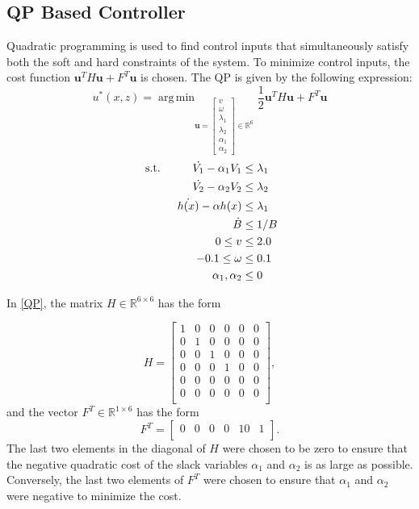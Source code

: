 \documentclass[journal]{IEEEtran}
\DeclareMathOperator*{\argmin}{arg\,min}
\begin{document}
\subsection{QP Based Controller}
Quadratic programming is used to find control inputs that simultaneously satisfy both the soft and hard constraints of the system. To minimize control inputs, the cost function $\textbf{u}^TH\textbf{u}+F^T\textbf{u}$ is chosen. The QP is given by the following expression:
\begin{equation}
u^*(x,z) = \argmin_{\textbf{u}=
\left[\begin{matrix}
v\\
\omega\\
\lambda_1\\
\lambda_2\\
\alpha_1\\
\alpha_2
\end{matrix}\right]
\in \mathbb{R}^6}
\frac{1}{2}\textbf{u}^TH\textbf{u}+F^T\textbf{u} 
\label{QP}
\end{equation}
\begin{align}
\text{ s.t.\hspace{1cm}}
\dot{V_1} -\alpha_1 V_1 & \leq\lambda_1\\
\dot{V_2} -\alpha_2 V_2 & \leq\lambda_2\\
\dot{h(x)}-\alpha h(x) & \leq \lambda_1\\
\dot{B} & \leq 1/B\\
0 \leq v & \leq 2.0\\
-0.1\leq \omega & \leq 0.1\\
\alpha_1,\alpha_2 & \leq 0
\end{align}

In \eqref{QP}, the matrix $H\in \mathbb{R}^{6\times 6}$ has the form

\begin{equation}
H=\left[ \begin{matrix}
1 & 0 &0&0& 0 & 0\\
0 &1& 0 &0& 0& 0\\
0& 0 &1& 0& 0& 0\\
0& 0& 0& 1& 0& 0\\
0& 0& 0& 0& 0& 0\\
0& 0& 0& 0& 0& 0\\
\end{matrix}\right],
\end{equation}
and the vector $F^T\in \mathbb{R}^{1\times 6}$ has the form 
\begin{equation}
F^T=\left[ \begin{matrix}
0 & 0 &0&0& 10 & 1\\
\end{matrix}\right].
\end{equation} The last two elements in the diagonal of $H$ were chosen to be zero to ensure that the negative quadratic cost of the slack variables $\alpha_1$ and $\alpha_2$ is as large as possible. Conversely, the last two elements of $F^T$ were chosen to ensure that $\alpha_1$ and $\alpha_2$ were negative to minimize the cost.
\end{document}
